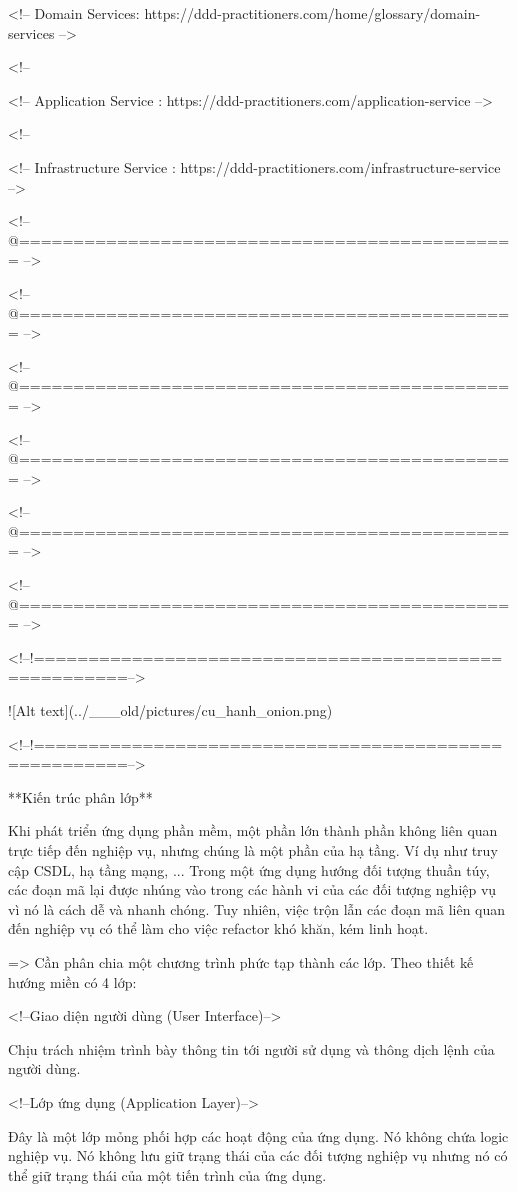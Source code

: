 <!-- Domain Services: https://ddd-practitioners.com/home/glossary/domain-services -->

<!-- %

<!-- Application Service : https://ddd-practitioners.com/application-service -->

<!-- %

<!-- Infrastructure Service : https://ddd-practitioners.com/infrastructure-service -->

<!--@============================================== -->

<!--@============================================== -->

<!--@============================================== -->

<!--@============================================== -->

<!--@============================================== -->

<!--@============================================== -->

<!--!======================================================-->

![Alt text](../___old/pictures/cu_hanh_onion.png)

<!--!======================================================-->


**Kiến trúc phân lớp**

Khi phát triển ứng dụng phần mềm, một phần lớn thành phần không liên quan trực tiếp đến nghiệp vụ, nhưng chúng là một phần của hạ tầng. Ví dụ như truy cập CSDL, hạ tầng mạng, ... Trong một ứng dụng hướng đối tượng thuần túy, các đoạn mã lại được nhúng vào trong các hành vi của các đối tượng nghiệp vụ vì nó là cách dễ và nhanh chóng. Tuy nhiên, việc trộn lẫn các đoạn mã liên quan đến nghiệp vụ có thể làm cho việc refactor khó khăn, kém linh hoạt.

=> Cần phân chia một chương trình phức tạp thành các lớp. Theo thiết kế hướng miền có 4 lớp:

<!--Giao diện người dùng (User Interface)-->

Chịu trách nhiệm trình bày thông tin tới người sử dụng và thông dịch lệnh của người dùng.

<!--Lớp ứng dụng (Application Layer)-->

Đây là một lớp mỏng phối hợp các hoạt động của ứng dụng. Nó không chứa logic nghiệp vụ. Nó không lưu giữ trạng thái của các đối tượng nghiệp vụ nhưng nó có thể giữ trạng thái của một tiến trình của ứng dụng.


